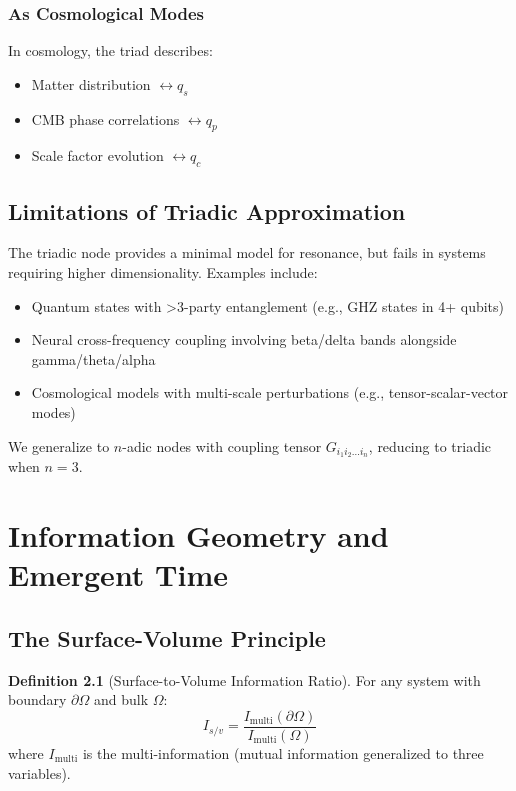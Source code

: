 \documentclass[openany]{memoir}
\theoremstyle{definition}
\newtheorem{definition}{Definition}[chapter]
\theoremstyle{plain}
\theoremstyle{remark}
\newcommand{\Imulti}{I_{\text{multi}}}
\newcommand{\Isv}{I_{s/v}}
\begin{document}
\subsection{As Cosmological Modes}
In cosmology, the triad describes:
\begin{itemize}
\item Matter distribution $\leftrightarrow q_s$
\item CMB phase correlations $\leftrightarrow q_p$
\item Scale factor evolution $\leftrightarrow q_c$
\end{itemize}

\section{Limitations of Triadic Approximation}
\label{sec:triad_limits}

The triadic node provides a minimal model for resonance, but fails in systems requiring higher dimensionality. Examples include:
\begin{itemize}
\item Quantum states with >3-party entanglement (e.g., GHZ states in 4+ qubits)
\item Neural cross-frequency coupling involving beta/delta bands alongside gamma/theta/alpha
\item Cosmological models with multi-scale perturbations (e.g., tensor-scalar-vector modes)
\end{itemize}

We generalize to $n$-adic nodes with coupling tensor $G_{i_1 i_2 \dots i_n}$, reducing to triadic when $n=3$.

\chapter{Information Geometry and Emergent Time}

\section{The Surface-Volume Principle}

\begin{definition}[Surface-to-Volume Information Ratio]
For any system with boundary $\partial\Omega$ and bulk $\Omega$:
\begin{equation}
\Isv = \frac{\Imulti(\partial\Omega)}{\Imulti(\Omega)}
\end{equation}
where $\Imulti$ is the multi-information (mutual information generalized to three variables).
\end{definition}
\end{document}
